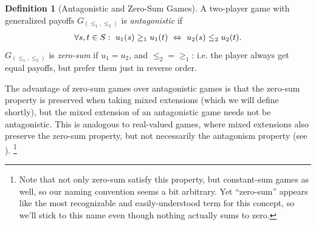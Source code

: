 \documentclass[a4paper]{scrreprt}
\theoremstyle{definition}
\newtheorem{defn}[thm]{Definition} %
\begin{document}
    \begin{defn}[Antagonistic and Zero-Sum Games]
        A two-player game with generalized payoffs $G_{(\leq_1, \leq_2)}$ is \emph{antagonistic} if
        \begin{gather*}
            \forall s, t \in S:~ u_1(s) \geq_1 u_1(t) ~\Leftrightarrow~ u_2(s) \leq_2 u_2(t).
        \end{gather*}
        $G_{(\leq_1, \leq_2)}$ is \emph{zero-sum} if $u_1 = u_2$, and $\leq_2 {=} \geq_1$: i.e. the player always get equal payoffs, but prefer them just in reverse order.
        \label{def:zeroSumGeneralizedPayoffs}
    \end{defn}
    
    The advantage of zero-sum games over antagonistic games is that the zero-sum property is preserved when taking mixed extensions (which we will define shortly), but the mixed extension of an antagonistic game needs not be antagonistic. 
    This is analogous to real-valued games, where mixed extensions also preserve the zero-sum property, but not necessarily the antagonism property (see \cite{bib:andersonAntagonisticGames}).
    \footnote{Note that not only zero-sum satisfy this property, but constant-sum games as well, so our naming convention seems a bit arbitrary.
        Yet “zero-sum” appears like the most recognizable and easily-understood term for this concept, so we'll stick to this name even though nothing actually sums to zero.}
    
\end{document}
